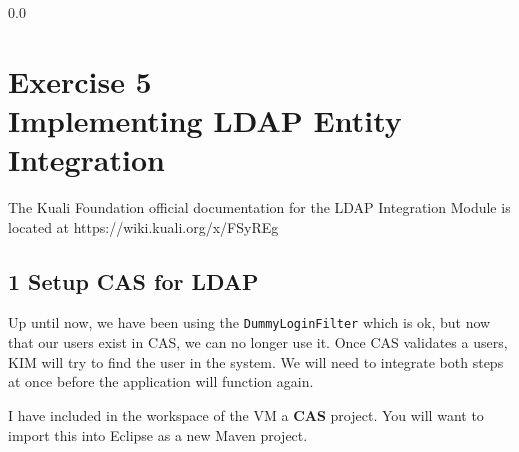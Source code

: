 {\setlength{\baselineskip}%
  {0.0\baselineskip}
  \section*{\flushright Exercise 5\\
  Implementing LDAP Entity Integration}
  \hrulefill \par}

The Kuali Foundation official documentation for the LDAP Integration
Module is located at https://wiki.kuali.org/x/FSyREg

\subsection*{1 Setup CAS for LDAP}
Up until now, we have been using the \verb|DummyLoginFilter| which is
ok, but now that our users exist in CAS, we can no longer use it. Once
CAS validates a users, KIM will try to find the user in the system. We
will need to integrate both steps at once before the application will
function again.

I have included in the workspace of the VM a \textbf{CAS} project. You
will want to import this into Eclipse as a new Maven project.

